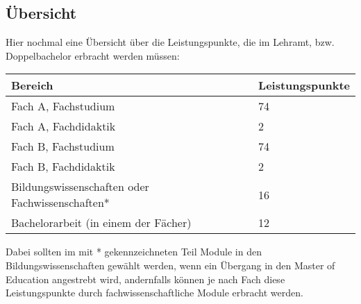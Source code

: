 \subsection{Übersicht} %
Hier nochmal eine Übersicht über die Leistungspunkte, die im Lehramt, bzw. Doppelbachelor erbracht werden müssen:

\begin{table*}[htb]
	\centering

	\begin{tabular}{ll}
		\toprule
		Bereich  & Leistungspunkte\\
		\midrule
		Fach A, Fachstudium & 74\\
		Fach A, Fachdidaktik & \phantom{0}2\\
		\addlinespace
		Fach B, Fachstudium & 74\\
		Fach B, Fachdidaktik & \phantom{0}2\\
		\addlinespace
		Bildungswissenschaften oder Fachwissenschaften* & 16\\
		\addlinespace
		Bachelorarbeit (in einem der Fächer) & 12\\
		\bottomrule
	\end{tabular}

\end{table*}
Dabei sollten im mit * gekennzeichneten Teil Module in den
Bildungswissenschaften gewählt werden, wenn ein Übergang in den Master of
Education angestrebt wird, andernfalls können je nach Fach diese
Leistungspunkte durch fachwissenschaftliche Module erbracht werden.
